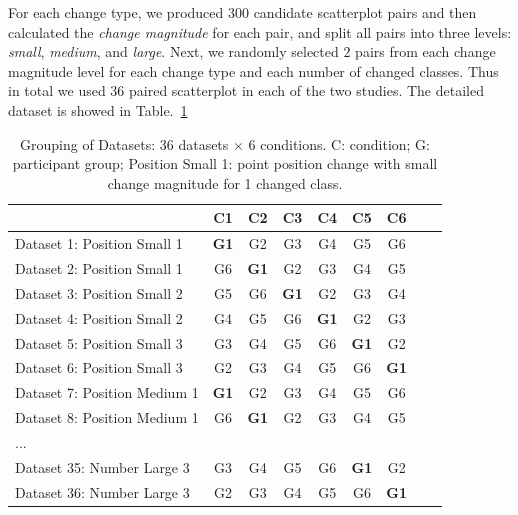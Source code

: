 For each change type, we produced 300 candidate scatterplot pairs and then calculated the \emph{change magnitude} for each pair, and split all  pairs into three levels: \emph{small},  \emph{medium}, and \emph{large}.
Next, we randomly selected $2$ pairs from each change magnitude level for each change type and each number of changed classes. Thus in total we used $36$ paired scatterplot in each of the two studies. The detailed dataset is showed in Table.~\ref{tab:latinsquare}

\begin{table}[ht]
     \renewcommand\arraystretch{1}
     \centering
     \caption{Grouping of Datasets: $36$ datasets $\times$ $6$ conditions. C: condition; G: participant group; Position Small 1: point position change with small change magnitude for 1 changed class.}
     \label{tab:latinsquare}
     \begin{tabular}{lcccccccc}
     \hline
      & C1 & C2 & C3  & C4 & C5 & C6 \\

     \hline
     Dataset 1: Position Small 1 & \textbf{G1} & G2 & G3  & G4 & G5 & G6 \\
     Dataset 2: Position Small 1 & G6 & \textbf{G1} & G2 & G3  & G4 & G5 \\
     Dataset 3: Position Small 2 & G5  & G6 & \textbf{G1} & G2 & G3 & G4 \\
     Dataset 4: Position Small 2 & G4 & G5  & G6 & \textbf{G1} & G2 & G3 \\
     Dataset 5: Position Small 3 & G3 & G4 & G5  & G6 & \textbf{G1} & G2 \\
     Dataset 6: Position Small 3 & G2 & G3 & G4  & G5 & G6 & \textbf{G1} \\
     Dataset 7: Position Medium 1 & \textbf{G1} & G2 & G3  & G4 & G5 & G6 \\
     Dataset 8: Position Medium 1 & G6 & \textbf{G1} & G2 & G3  & G4 & G5 \\
     ... & & & & & & &\\
     Dataset 35: Number Large 3 & G3 & G4 & G5  & G6 & \textbf{G1} & G2 \\
     Dataset 36: Number Large 3 & G2 & G3  & G4 & G5 & G6 & \textbf{G1}  \\

     \hline
     \end{tabular}
     \end{table}
%
